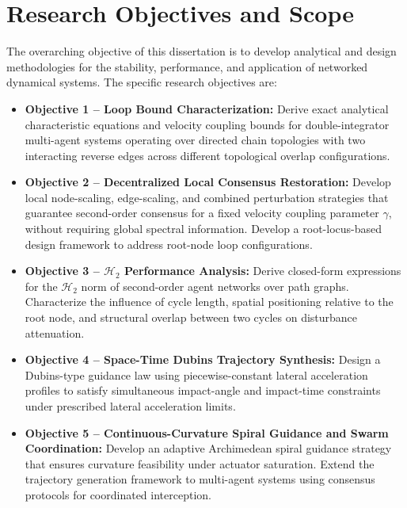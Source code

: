 \section{Research Objectives and Scope}
The overarching objective of this dissertation is to develop
analytical and design methodologies for the stability,
performance, and application of networked dynamical systems.
The specific research objectives are:
\begin{itemize}

    \item \textbf{Objective 1 -- Loop Bound Characterization:}
    Derive exact analytical characteristic equations and
    velocity coupling bounds for double-integrator
    multi-agent systems operating over directed chain
    topologies with two interacting reverse edges across
    different topological overlap configurations.

    \item \textbf{Objective 2 -- Decentralized Local Consensus
    Restoration:}
    Develop local node-scaling, edge-scaling, and combined
    perturbation strategies that guarantee second-order
    consensus for a fixed velocity coupling parameter
    $\gamma$, without requiring global spectral information.
    Develop a root-locus-based design framework to address
    root-node loop configurations.

    \item \textbf{Objective 3 -- $\mathcal{H}_2$ Performance
    Analysis:}
    Derive closed-form expressions for the $\mathcal{H}_2$
    norm of second-order agent networks over path graphs.
    Characterize the influence of cycle length, spatial
    positioning relative to the root node, and structural
    overlap between two cycles on disturbance attenuation.

    \item \textbf{Objective 4 -- Space-Time Dubins Trajectory
    Synthesis:}
    Design a Dubins-type guidance law using piecewise-constant
    lateral acceleration profiles to satisfy simultaneous
    impact-angle and impact-time constraints under prescribed
    lateral acceleration limits.

    \item \textbf{Objective 5 -- Continuous-Curvature Spiral
    Guidance and Swarm Coordination:}
    Develop an adaptive Archimedean spiral guidance strategy
    that ensures curvature feasibility under actuator
    saturation. Extend the trajectory generation framework
    to multi-agent systems using consensus protocols for
    coordinated interception.

\end{itemize}



